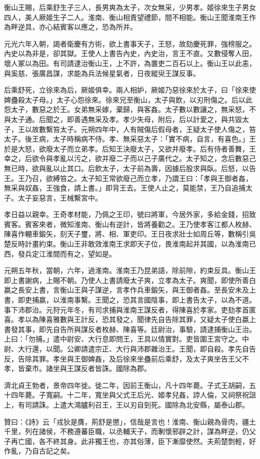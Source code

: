 \begin{pinyinscope}
衡山王賜，后乘舒生子三人，長男爽為太子，次女無采，少男孝。姬徐來生子男女四人，美人厥姬生子二人。淮南、衡山相責望禮節，間不相能。衡山王聞淮南王作為畔逆具，亦心結賓客以應之，恐為所并。

元光六年入朝，謁者衛慶有方術，欲上書事天子，王怒，故劾慶死罪，強榜服之。內史以為非是，卻其獄。王使人上書告內史，內史治，言王不直。又數侵奪人田，壞人冢以為田。有司請逮治衡山王，上不許，為置吏二百石以上。衡山王以此恚，與奚慈、張廣昌謀，求能為兵法候星氣者，日夜縱臾王謀反事。

后乘舒死，立徐來為后，厥姬俱幸。兩人相妒，厥姬乃惡徐來於太子，曰「徐來使婢蠱殺太子母。」太子心怨徐來。徐來兄至衡山，太子與飲，以刃刑傷之。后以此怨太子，數惡之於王。女弟無采嫁，棄歸，與客姦。太子數以數讓之，無采怒，不與太子通。后聞之，即善遇無采及孝。孝少失母，附后，后以計愛之，與共毀太子，王以故數繫笞太子。元朔四年中，人有賊傷后假母者，王疑太子使人傷之，笞太子。後王病，太子時稱病不侍。孝、無采惡太子：「實不病，自言，有喜色。」王於是大怒，欲廢太子而立弟孝。后知王決廢太子，又欲并廢孝。后有侍者善舞，王幸之，后欲令與孝亂以污之，欲并廢二子而以己子廣代之。太子知之，念后數惡己無已時，欲與亂以止其口。后飲太子，太子前為壽，因據后股求與臥。后怒，以告王。王乃召，欲縛笞之。太子知王常欲廢己而立孝，乃謂王曰：「孝與王御者姦，無采與奴姦，王強食，請上書。」即背王去。王使人止之，莫能禁，王乃自追捕太子。太子妄惡言，王械繫宮中。

孝日益以親幸。王奇孝材能，乃佩之王印，號曰將軍，今居外家，多給金錢，招致賓客。賓客來者，微知淮南、衡山有逆計，皆將養勸之。王乃使孝客江都人枚赫、陳喜作輣車鍛矢，刻天子璽，將、相、軍吏印。王日夜求壯士如周丘等，數稱引吳楚反時計畫約束。衡山王非敢效淮南王求即天子位，畏淮南起并其國，以為淮南已西，發兵定江淮間而有之，望如是。

元朔五年秋，當朝，六年，過淮南。淮南王乃昆弟語，除前隙，約束反具。衡山王即上書謝病，上賜不朝。乃使人上書請廢太子爽，立孝為太子。爽聞，即使所善白嬴之長安上書，言衡山王與子謀逆，言孝作兵車鍛矢，與王御者姦。至長安未及上書，即吏捕嬴，以淮南事繫。王聞之，恐其言國陰事，即上書告太子，以為不道。事下沛郡治。元狩元年冬，有司求捕與淮南王謀反者，得陳喜於孝家。吏劾孝首匿喜。孝以為陳喜雅數與王計反，恐其發之，聞律先自告除其罪，又疑太子使白嬴上書發其事，即先自告所與謀反者枚赫、陳喜等。廷尉治，事驗，請逮捕衡山王治。上曰：「勿捕。」遣中尉安、大行息即問王，王具以情實對。吏皆圍王宮守之。中尉、大行還，以聞。公卿請遣宗正、大行與沛郡雜治王。王聞，即自殺。孝先自告反，告除其罪。孝坐與王御婢姦，及后徐來坐蠱前后乘舒，及太子爽坐告王父不孝，皆棄市。諸坐與王謀反者皆誅。國除為郡。

濟北貞王勃者，景帝四年徙。徙二年，因前王衡山，凡十四年薨。子式王胡嗣，五十四年薨。子寬嗣。十二年，寬坐與父式王后光、姬孝兒姦，誖人倫，又祠祭祝詛上，有司請誅。上遣大鴻臚利召王，王以刃自剄死。國除為北安縣，屬泰山郡。

贊曰：《詩》云「戎狄是膺，荊舒是懲」，信哉是言也！淮南、衡山親為骨肉，疆土千里，列在諸侯，不務遵蕃臣職，以丞輔天子，而剸懷邪辟之計，謀為畔逆，仍父子再亡國，各不終其身。此非獨王也，亦其俗薄，臣下漸靡使然。夫荊楚剽輕，好作亂，乃自古記之矣。


\end{pinyinscope}